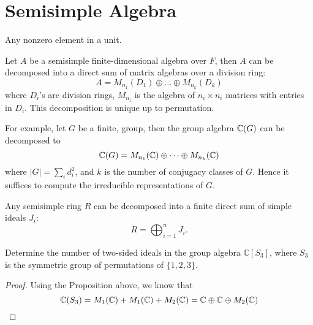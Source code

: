 


\chapter{Semisimple Algebra}




\begin{defn}
    Any nonzero element in a unit.
\end{defn}
\begin{prop}
    Let $A$ be a semisimple finite-dimensional algebra over $F$, then $A$ can be decomposed into a direct sum of matrix algebras over a division ring:
    \begin{equation*}
        A=M_{n_1}(D_1)\oplus\dots\oplus M_{n_k}(D_k)
    \end{equation*}
    where $D_i$'s are division rings, $M_{n_i}$ is the algebra of $n_i\times n_i$ matrices with entries in $D_i$. This decomposition is unique up to permutation.

    For example, let $G$ be a finite, group, then the group algebra $\mathbb{C}(G)$ can be decomposed to 
    \begin{equation*}
        \mathbb{C}(G)=M_{n_1}(\mathbb{C})\oplus\dots\oplus M_{n_k}(\mathbb{C})
    \end{equation*}
    where $|G|=\sum_id_i^2$, and $k$ is the number of conjugacy classes of $G$. Hence it suffices to compute the irreducible representations of $G$.
\end{prop}

\begin{prop}
    Any semisimple ring \( R \) can be decomposed into a finite direct sum of simple ideals \( J_i \):
\[
R = \bigoplus_{i=1}^n J_i.
\]
\end{prop}

\begin{prob}[F2019-Q5]
    Determine the number of two-sided ideals in the group algebra \(\mathbb{C}[S_3]\), where \(S_3\) is the symmetric group of permutations of \(\{1, 2, 3\}\).
\end{prob}
\begin{proof}
    Using the Proposition above, we know that 
    \begin{equation*}
        \mathbb{C}(S_3)=M_1(\mathbb{C})+M_1(\mathbb{C})+M_2(\mathbb{C})=\mathbb{C}\oplus\mathbb{C}\oplus M_2(\mathbb{C})
    \end{equation*}
\end{proof}



